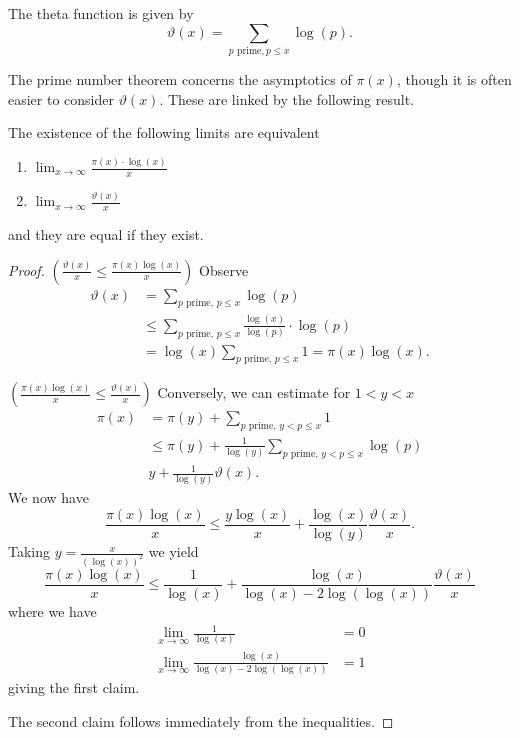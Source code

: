 \begin{definition}\label{def: theta function}
    The theta function is given by 
    $$\vartheta(x)=\sum_{p\text{ prime}, p\leq x}\log(p).$$
\end{definition}
The prime number theorem concerns the asymptotics of $\pi(x)$, though it is often easier to consider $\vartheta(x)$. These are linked by the following result. 
\begin{proposition}\label{prop: equivalence of PNT limits}
    The existence of the following limits are equivalent 
    \begin{enumerate}[label=(\alph*)]
        \item $\lim_{x\to\infty}\frac{\pi(x)\cdot\log(x)}{x}$
        \item $\lim_{x\to\infty}\frac{\vartheta(x)}{x}$
    \end{enumerate}
    and they are equal if they exist. 
\end{proposition}
\begin{proof}
    $\left(\frac{\vartheta(x)}{x}\leq\frac{\pi(x)\log(x)}{x}\right)$ Observe 
    \begin{align*}
        \vartheta(x)&=\sum_{p\text{ prime, } p\leq x}\log(p)\\
        &\leq \sum_{p\text{ prime, } p\leq x}\frac{\log(x)}{\log(p)}\cdot\log(p)\\
        &=\log(x)\sum_{p\text{ prime, } p\leq x}1=\pi(x)\log(x).
    \end{align*}

    $\left(\frac{\pi(x)\log(x)}{x}\leq\frac{\vartheta(x)}{x}\right)$ Conversely, we can estimate for $1<y<x$
    \begin{align*}
        \pi(x) &= \pi(y)+\sum_{p\text{ prime, } y<p\leq x}1 \\
        &\leq \pi(y)+\frac{1}{\log(y)}\sum_{p\text{ prime, } y<p\leq x}\log(p) \\
        &y+\frac{1}{\log(y)}\vartheta(x).
    \end{align*}
    We now have 
    $$\frac{\pi(x)\log(x)}{x}\leq\frac{y\log(x)}{x}+\frac{\log(x)}{\log(y)}\frac{\vartheta(x)}{x}.$$
    Taking $y=\frac{x}{(\log(x))^{2}}$ we yield 
    $$\frac{\pi(x)\log(x)}{x}\leq\frac{1}{\log(x)}+\frac{\log(x)}{\log(x)-2\log(\log(x))}\frac{\vartheta(x)}{x}$$
    where we have 
    \begin{align*}
        \lim_{x\to\infty}\frac{1}{\log(x)} &= 0 \\
        \lim_{x\to\infty}\frac{\log(x)}{\log(x)-2\log(\log(x))}&= 1
    \end{align*}
    giving the first claim. 

    The second claim follows immediately from the inequalities.
\end{proof}
